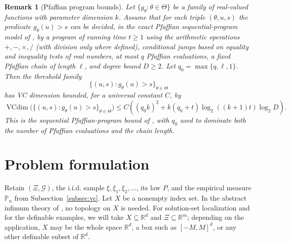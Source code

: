 \documentclass[11pt]{article}
\newtheorem{remark}[theorem]{Remark}
\begin{document}
\begin{remark}[Pfaffian program bounds]\label{rem:MP}
Let $\{g_{\theta}:\theta\in\Theta\}$ be a family of real-valued
functions with parameter dimension $k$. Assume that for each triple
$(\theta,u,s)$ the predicate $g_{\theta}(u)>s$ can be decided, in
the exact Pfaffian sequential-program model of \citet[Theorem~4]{MontanaPardo2009},
by a program of running time $t\ge1$ using the arithmetic operations
$+,-,\times,/$ (with division only where defined), conditional jumps
based on equality and inequality tests of real numbers, at most $q$
Pfaffian evaluations, a fixed Pfaffian chain of length $\ell$, and
degree bound $D\ge2$. Let $q_{0}=\max\{q,\ell,1\}$. Then the
threshold family 
\[
\bigl\{(u,s):g_{\theta}(u)>s\bigr\}_{\theta\in\Theta}
\]
has VC dimension bounded, for a universal constant $C$, by 
\begin{equation}
\operatorname{VCdim}\bigl(\{(u,s):g_{\theta}(u)>s\}_{\theta\in\Theta}\bigr)\le C\left((q_{0}k)^{2}+k(q_{0}+t)\log_{2}((k+1)t)\log_{2}D\right).\label{eq:MP-bound}
\end{equation}
This is the sequential Pfaffian-program bound of \citet[Theorem~4]{MontanaPardo2009},
with $q_{0}$ used to dominate both the number of Pfaffian evaluations
and the chain length. \end{remark}

\section{Problem formulation}

\label{sec:setup}

Retain $(\Xi,\mathcal{G})$, the i.i.d. sample $\xi,\xi_{1},\xi_{2},\dots$,
its law $P$, and the empirical measure $\mathbb{P}_{n}$ from Subsection~\ref{subsec:vc}.
Let $X$ be a nonempty index set. In the abstract infimum theory of
\citet{Westerhout2024}, no topology on $X$ is needed. For solution-set
localization and for the definable examples, we will take
$X\subseteq\mathbb{R}^{d}$ and $\Xi\subseteq\mathbb{R}^{m}$; depending
on the application, $X$ may be the whole space $\mathbb{R}^{d}$,
a box such as $[-M,M]^{d}$, or any other definable subset of $\mathbb{R}^{d}$.
\end{document}
